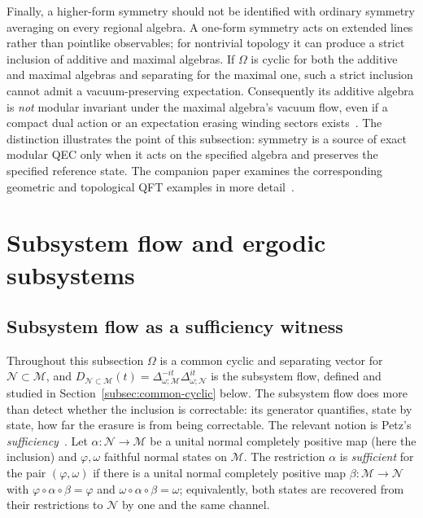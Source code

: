 \documentclass[a4paper,11pt]{article}
\theoremstyle{definition}
\newcommand{\mN}{\mathcal{N}}
\newcommand{\mM}{\mathcal{M}}
\begin{document}
Finally, a higher-form symmetry should not be identified with ordinary
symmetry averaging on every regional algebra. A one-form symmetry acts
on extended lines rather than pointlike observables; for nontrivial
topology it can produce a strict inclusion of additive and maximal
algebras. If $\Omega$ is cyclic for both the additive and maximal algebras and separating
for the maximal one, such a strict inclusion cannot admit a
vacuum-preserving expectation. Consequently its additive algebra is
\emph{not} modular invariant under the maximal algebra's vacuum flow,
even if a compact dual action or an expectation erasing winding sectors
exists~\cite{GaiottoKapustinSeibergWillett2015,CasiniHuertaMaganPontello2021}.
The distinction illustrates the point of this subsection: symmetry is a
source of exact modular QEC only when it acts on the specified algebra
and preserves the specified reference state. The companion paper
examines the corresponding geometric and topological QFT examples in
more detail~\cite{companionQFT}.


\section{Subsystem flow and ergodic subsystems}\label{sec:ergodic}








\subsection{Subsystem flow as a sufficiency witness}\label{subsec:QEC-sufficiency}

Throughout this subsection $\Omega$ is a common cyclic and separating vector for $\mN\subset\mM$, and $D_{\mN\subset\mM}(t)=\Delta_{\omega;\mM}^{-it}\Delta_{\omega;\mN}^{it}$ is the subsystem flow, defined and studied in Section~\ref{subsec:common-cyclic} below. The subsystem flow does more than detect whether the inclusion is correctable: its generator quantifies, state by state, how far the erasure is from being correctable. The relevant notion is Petz's \emph{sufficiency}~\cite{Petz1986,Petz1988,OhyaPetz1993}. Let $\alpha:\mN\to\mM$ be a unital normal completely positive map (here the inclusion) and $\varphi,\omega$ faithful normal states on $\mM$. The restriction $\alpha$ is \emph{sufficient} for the pair $(\varphi,\omega)$ if there is a unital normal completely positive map $\beta:\mM\to\mN$ with $\varphi\circ\alpha\circ\beta=\varphi$ and $\omega\circ\alpha\circ\beta=\omega$; equivalently, both states are recovered from their restrictions to $\mN$ by one and the same channel.
\end{document}
